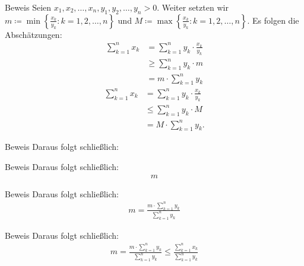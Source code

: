 \documentclass[10pt]{beamer}
\begin{document}
\begin{frame}{Beweis}
     Seien \( x_{1}, x_{2}, \ldots, x_{n}, y_{1}, y_{2}, \ldots, y_{n} > 0 \). Weiter setzten wir \( m \coloneq \min\left\{ \frac{x_{k}}{y_{k}} : k = 1, 2, \ldots, n \right\} \) und \( M \coloneq \max\left\{ \frac{x_{k}}{y_{k}} : k = 1, 2, \ldots, n \right\} \). Es folgen die Abschätzungen:
     \begin{align*}
        \sum_{k = 1}^{n} x_{k}
        & = \sum_{k = 1}^{n} y_{k} \cdot \frac{x_{k}}{y_{k}} \\
        & \geq \sum_{k = 1}^{n} y_{k} \cdot m \\
        & = m \cdot \sum_{k = 1}^{n} y_{k}
     \end{align*}
     \begin{align*}
        \sum_{k = 1}^{n} x_{k}
        & = \sum_{k = 1}^{n} y_{k} \cdot \frac{x_{k}}{y_{k}} \\
        & \leq \sum_{k = 1}^{n} y_{k} \cdot M \\
        & = M \cdot \sum_{k = 1}^{n} y_{k}.
     \end{align*}
\end{frame}



\begin{frame}{Beweis}
     Daraus folgt schließlich:
\end{frame}



\begin{frame}{Beweis}
     Daraus folgt schließlich:
     \begin{align*}
         m
     \end{align*}
\end{frame}



\begin{frame}{Beweis}
     Daraus folgt schließlich:
     \begin{align*}
         m
         = \frac{m \cdot \sum_{k = 1}^{n} y_{k}}{\sum_{k = 1}^{n} y_{k}}
     \end{align*}
\end{frame}



\begin{frame}{Beweis}
     Daraus folgt schließlich:
     \begin{align*}
         m
         = \frac{m \cdot \sum_{k = 1}^{n} y_{k}}{\sum_{k = 1}^{n} y_{k}}
         \leq \frac{\sum_{k = 1}^{n} x_{k}}{\sum_{k = 1}^{n} y_{k}}
     \end{align*}
\end{frame}
\end{document}
